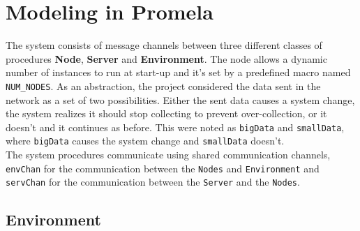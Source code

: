 





\section{Modeling in Promela}


The system consists of message channels between three different classes of procedures \textbf{Node}, \textbf{Server} and \textbf{Environment}. The node allows a dynamic number of instances to run at start-up and it's set by a predefined macro named \texttt{NUM\_NODES}. As an abstraction, the project considered the data sent in the network as a set of two possibilities. Either the sent data causes a system change, the system realizes it should stop collecting to prevent over-collection, or it doesn't and it continues as before. This were noted as \texttt{bigData} and \texttt{smallData}, where \texttt{bigData} causes the system change and \texttt{smallData} doesn't. \\

The system procedures communicate using shared communication channels, \texttt{envChan} for the communication between the \texttt{Nodes} and \texttt{Environment} and \texttt{servChan} for the communication between the \texttt{Server} and the \texttt{Nodes}.

\subsection{Environment}

